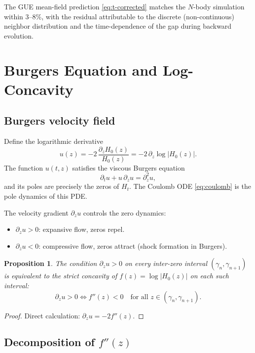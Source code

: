 \documentclass[11pt,a4paper]{article}
\newtheorem{proposition}{Proposition}
\begin{document}
The GUE mean-field prediction \eqref{eq:t-corrected} matches the
$N$-body simulation within 3--8\%, with the residual attributable to
the discrete (non-continuous) neighbor distribution and the
time-dependence of the gap during backward evolution.

\section{Burgers Equation and Log-Concavity}\label{sec:burgers}

\subsection{Burgers velocity field}

Define the logarithmic derivative
\begin{equation}\label{eq:burgers-u}
  u(z) = -2\,\frac{\partial_z H_0(z)}{H_0(z)}
  = -2\,\partial_z\log|H_0(z)|.
\end{equation}
The function $u(t,z)$ satisfies the viscous Burgers equation
\[
  \partial_t u + u\,\partial_z u = \partial_z^2 u,
\]
and its poles are precisely the zeros of $H_t$. The Coulomb ODE
\eqref{eq:coulomb} is the pole dynamics of this PDE.

The velocity gradient $\partial_z u$ controls the zero dynamics:
\begin{itemize}
  \item $\partial_z u > 0$: expansive flow, zeros repel.
  \item $\partial_z u < 0$: compressive flow, zeros attract (shock
    formation in Burgers).
\end{itemize}

\begin{proposition}\label{prop:logconcavity}
  The condition $\partial_z u > 0$ on every inter-zero interval
  $({\gamma_n, \gamma_{n+1}})$ is equivalent to the strict concavity
  of $f(z) = \log|H_0(z)|$ on each such interval:
  \[
    \partial_z u > 0 \iff f''(z) < 0 \quad
    \text{for all } z \in (\gamma_n, \gamma_{n+1}).
  \]
\end{proposition}
\begin{proof}
  Direct calculation: $\partial_z u = -2f''(z)$.
\end{proof}

\subsection{Decomposition of $f''(z)$}
\end{document}
